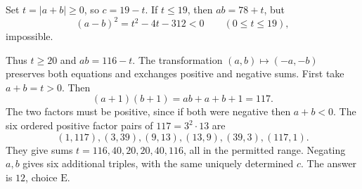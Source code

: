 Set $t=|a+b|\ge0$, so $c=19-t$. If $t\le19$, then $ab=78+t$, but
\[
(a-b)^2=t^2-4t-312<0\qquad(0\le t\le19),
\]
impossible.

Thus $t\ge20$ and $ab=116-t$. The transformation $(a,b)\mapsto(-a,-b)$ preserves both equations and exchanges positive and negative sums. First take $a+b=t>0$. Then
\[
(a+1)(b+1)=ab+a+b+1=117.
\]
The two factors must be positive, since if both were negative then $a+b<0$. The six ordered positive factor pairs of $117=3^2\cdot13$ are
\[
(1,117),(3,39),(9,13),(13,9),(39,3),(117,1).
\]
They give sums $t=116,40,20,20,40,116$, all in the permitted range. Negating $a,b$ gives six additional triples, with the same uniquely determined $c$. The answer is $\boxed{12}$, choice $\boxed{\text{E}}$.
